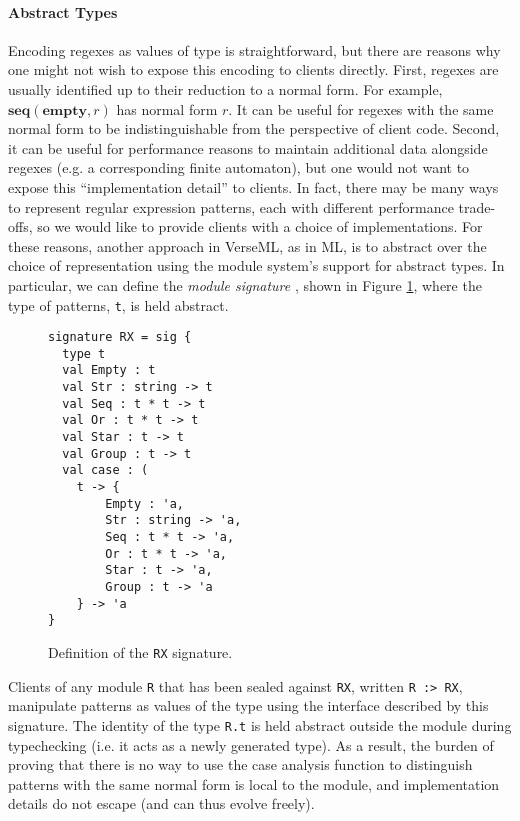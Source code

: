 {{\paragraph{Abstract Types} Encoding regexes as values of type  is straightforward, but there are reasons why one might not wish to expose this encoding to clients directly. First, regexes are usually identified up to their reduction to a normal form. For example, $\textbf{seq}(\textbf{empty}, r)$ has normal form $r$. It can be useful for regexes with the same normal form to be  indistinguishable from the perspective of client code. Second, it can be useful for performance reasons to maintain additional data alongside regexes (e.g. a corresponding finite automaton), but one would not want to expose this ``implementation detail'' to clients. In fact, there may be many ways to represent regular expression patterns, each with different performance trade-offs, so we would like to provide clients with a choice of implementations. For these reasons, another approach in VerseML, as in ML, is to abstract over the choice of representation using  the module system's support for abstract types. In particular, we can define the \emph{module signature} , shown in Figure \ref{fig:signature-RX}, where the type of patterns, \lstinline{t}, is held abstract.

\begin{figure}[ht]
\begin{lstlisting}[deletekeywords={case},numbers=none]
signature RX = sig {
  type t
  val Empty : t
  val Str : string -> t
  val Seq : t * t -> t
  val Or : t * t -> t
  val Star : t -> t
  val Group : t -> t
  val case : (
    t -> {
    	Empty : 'a,
    	Str : string -> 'a,
    	Seq : t * t -> 'a,
    	Or : t * t -> 'a,
    	Star : t -> 'a,
    	Group : t -> 'a
    } -> 'a
}
\end{lstlisting}
\caption{Definition of the \lstinline{RX} signature.}
\label{fig:signature-RX}
\end{figure}

 Clients of any module \lstinline{R} that has been sealed against \lstinline{RX}, written \lstinline{R :> RX}, manipulate patterns as values of the type  using the interface described by this signature. The identity of the type \lstinline{R.t} is held abstract outside the module during typechecking (i.e. it acts as a newly generated type). As a result, the burden of proving that there is no way to use the case analysis function to distinguish patterns with the same normal form is local to the module, and implementation details do not escape (and can thus evolve freely). %

}}

